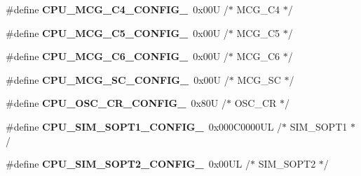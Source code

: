 \begin{DoxyCompactItemize}
\item 
\#define {\bfseries C\+P\+U\+\_\+\+M\+C\+G\+\_\+\+C4\+\_\+\+C\+O\+N\+F\+I\+G\+\_}~0x00\+U /$\ast$ M\+C\+G\+\_\+\+C4 $\ast$/\hypertarget{group___c_p_u___config__module_ga59edb0de8ef684449a107baa09fedf58}{}\label{group___c_p_u___config__module_ga59edb0de8ef684449a107baa09fedf58}

\item 
\#define {\bfseries C\+P\+U\+\_\+\+M\+C\+G\+\_\+\+C5\+\_\+\+C\+O\+N\+F\+I\+G\+\_}~0x00\+U /$\ast$ M\+C\+G\+\_\+\+C5 $\ast$/\hypertarget{group___c_p_u___config__module_ga8a428c4cc6b184881cb5cc2ad30a107c}{}\label{group___c_p_u___config__module_ga8a428c4cc6b184881cb5cc2ad30a107c}

\item 
\#define {\bfseries C\+P\+U\+\_\+\+M\+C\+G\+\_\+\+C6\+\_\+\+C\+O\+N\+F\+I\+G\+\_}~0x00\+U /$\ast$ M\+C\+G\+\_\+\+C6 $\ast$/\hypertarget{group___c_p_u___config__module_gae73de55033621d3e4d69431ecbc3b648}{}\label{group___c_p_u___config__module_gae73de55033621d3e4d69431ecbc3b648}

\item 
\#define {\bfseries C\+P\+U\+\_\+\+M\+C\+G\+\_\+\+S\+C\+\_\+\+C\+O\+N\+F\+I\+G\+\_}~0x00\+U /$\ast$ M\+C\+G\+\_\+\+S\+C $\ast$/\hypertarget{group___c_p_u___config__module_ga5014f663836b8b4dcaa46c53d507de91}{}\label{group___c_p_u___config__module_ga5014f663836b8b4dcaa46c53d507de91}

\item 
\#define {\bfseries C\+P\+U\+\_\+\+O\+S\+C\+\_\+\+C\+R\+\_\+\+C\+O\+N\+F\+I\+G\+\_}~0x80\+U /$\ast$ O\+S\+C\+\_\+\+C\+R $\ast$/\hypertarget{group___c_p_u___config__module_ga0aca53a3492dcacda35c0e9b54d3019a}{}\label{group___c_p_u___config__module_ga0aca53a3492dcacda35c0e9b54d3019a}

\item 
\#define {\bfseries C\+P\+U\+\_\+\+S\+I\+M\+\_\+\+S\+O\+P\+T1\+\_\+\+C\+O\+N\+F\+I\+G\+\_}~0x000\+C0000\+U\+L /$\ast$ S\+I\+M\+\_\+\+S\+O\+P\+T1 $\ast$/\hypertarget{group___c_p_u___config__module_gacd8a41cef8e442cdb5cd0e65c7b3dd0d}{}\label{group___c_p_u___config__module_gacd8a41cef8e442cdb5cd0e65c7b3dd0d}

\item 
\#define {\bfseries C\+P\+U\+\_\+\+S\+I\+M\+\_\+\+S\+O\+P\+T2\+\_\+\+C\+O\+N\+F\+I\+G\+\_}~0x00\+U\+L /$\ast$ S\+I\+M\+\_\+\+S\+O\+P\+T2 $\ast$/\hypertarget{group___c_p_u___config__module_ga5a7d949293fd3c63ec5cf77f6cda8d6e}{}\label{group___c_p_u___config__module_ga5a7d949293fd3c63ec5cf77f6cda8d6e}


\end{DoxyCompactItemize}
